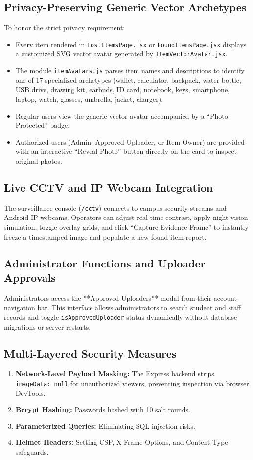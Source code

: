 \documentclass[11pt,a4paper]{article}
\begin{document}
\subsection{Privacy-Preserving Generic Vector Archetypes}
To honor the strict privacy requirement:
\begin{itemize}
    \item Every item rendered in \texttt{LostItemsPage.jsx} or \texttt{FoundItemsPage.jsx} displays a customized SVG vector avatar generated by \texttt{ItemVectorAvatar.jsx}.
    \item The module \texttt{itemAvatars.js} parses item names and descriptions to identify one of 17 specialized archetypes (wallet, calculator, backpack, water bottle, USB drive, drawing kit, earbuds, ID card, notebook, keys, smartphone, laptop, watch, glasses, umbrella, jacket, charger).
    \item Regular users view the generic vector avatar accompanied by a ``Photo Protected'' badge.
    \item Authorized users (Admin, Approved Uploader, or Item Owner) are provided with an interactive ``Reveal Photo'' button directly on the card to inspect original photos.
\end{itemize}

\subsection{Live CCTV and IP Webcam Integration}
The surveillance console (\texttt{/cctv}) connects to campus security streams and Android IP webcams. Operators can adjust real-time contrast, apply night-vision simulation, toggle overlay grids, and click ``Capture Evidence Frame'' to instantly freeze a timestamped image and populate a new found item report.

\subsection{Administrator Functions and Uploader Approvals}
Administrators access the **Approved Uploaders** modal from their account navigation bar. This interface allows administrators to search student and staff records and toggle \texttt{isApprovedUploader} status dynamically without database migrations or server restarts.

\subsection{Multi-Layered Security Measures}
\begin{enumerate}
    \item \textbf{Network-Level Payload Masking:} The Express backend strips \texttt{imageData: null} for unauthorized viewers, preventing inspection via browser DevTools.
    \item \textbf{Bcrypt Hashing:} Passwords hashed with 10 salt rounds.
    \item \textbf{Parameterized Queries:} Eliminating SQL injection risks.
    \item \textbf{Helmet Headers:} Setting CSP, X-Frame-Options, and Content-Type safeguards.
\end{enumerate}
\end{document}
